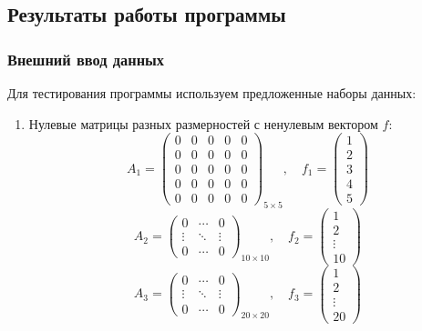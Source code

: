\subsection{Результаты работы программы}

\subsubsection{Внешний ввод данных}

Для тестирования программы используем предложенные наборы данных:
\begin{enumerate}
  \item Нулевые матрицы разных размерностей с ненулевым вектором \( f \):
  \[
    A_1=\begin{pmatrix} 0 & 0 & 0 & 0 & 0 \\ 0 & 0 & 0 & 0 & 0 \\ 0 & 0 & 0 & 0 & 0 \\ 0 & 0 & 0 & 0 & 0 \\ 0 & 0 & 0 & 0 & 0 \end{pmatrix}_{5 \times 5}, \quad f_1=\begin{pmatrix} 1 \\ 2 \\ 3 \\ 4 \\ 5 \end{pmatrix}
  \]
  \[
    A_2=\begin{pmatrix} 0 & \cdots & 0 \\ \vdots & \ddots & \vdots \\ 0 & \cdots & 0 \end{pmatrix}_{10 \times 10}, \quad f_2=\begin{pmatrix} 1 \\ 2 \\ \vdots \\ 10 \end{pmatrix}
  \]
  \[
    A_3=\begin{pmatrix} 0 & \cdots & 0 \\ \vdots & \ddots & \vdots \\ 0 & \cdots & 0 \end{pmatrix}_{20 \times 20}, \quad f_3=\begin{pmatrix} 1 \\ 2 \\ \vdots \\ 20 \end{pmatrix}
  \]
  

\end{enumerate}
